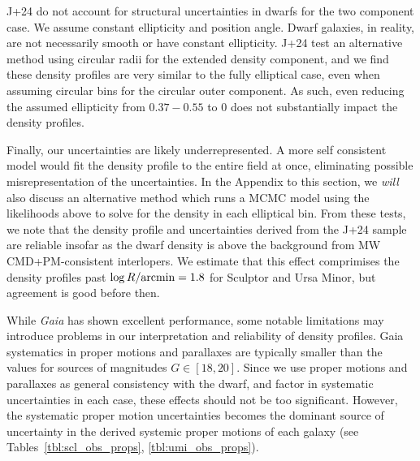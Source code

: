 J+24 do not account for structural uncertainties in dwarfs for the two
component case. We assume constant ellipticity and position angle. Dwarf
galaxies, in reality, are not necessarily smooth or have constant
ellipticity. J+24 test an alternative method using circular radii for
the extended density component, and we find these density profiles are
very similar to the fully elliptical case, even when assuming circular
bins for the circular outer component. As such, even reducing the
assumed ellipticity from \(0.37-0.55\) to 0 does not substantially
impact the density profiles.

Finally, our uncertainties are likely underrepresented. A more self
consistent model would fit the density profile to the entire field at
once, eliminating possible misrepresentation of the uncertainties. In
the Appendix to this section, we \emph{will} also discuss an alternative
method which runs a MCMC model using the likelihoods above to solve for
the density in each elliptical bin. From these tests, we note that the
density profile and uncertainties derived from the J+24 sample are
reliable insofar as the dwarf density is above the background from MW
CMD+PM-consistent interlopers. We estimate that this effect comprimises
the density profiles past \(\log R / {\rm arcmin} = 1.8\) for Sculptor
and Ursa Minor, but agreement is good before then.

While \emph{Gaia} has shown excellent performance, some notable
limitations may introduce problems in our interpretation and reliability
of density profiles. Gaia systematics in proper motions and parallaxes
are typically smaller than the values for sources of magnitudes
\(G\in[18,20]\). Since we use proper motions and parallaxes as general
consistency with the dwarf, and factor in systematic uncertainties in
each case, these effects should not be too significant. However, the
systematic proper motion uncertainties becomes the dominant source of
uncertainty in the derived systemic proper motions of each galaxy (see
Tables~\ref{tbl:scl_obs_props}, \ref{tbl:umi_obs_props}).

